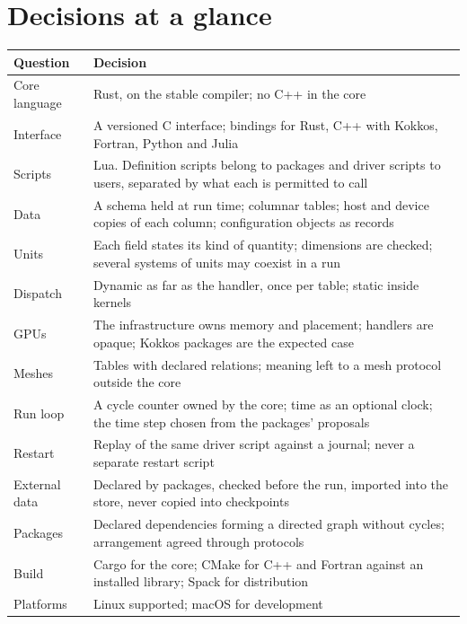 \documentclass[11pt,a4paper]{article}
\begin{document}
\section{Decisions at a glance}

\begin{center}
\small
\begin{tabularx}{\textwidth}{@{}>{\raggedright\arraybackslash}p{36mm} L@{}}
\toprule
Question & Decision \\
\midrule
Core language & Rust, on the stable compiler; no C++ in the core \\
Interface & A versioned C interface; bindings for Rust, C++ with Kokkos, Fortran, Python and Julia \\
Scripts & Lua.  Definition scripts belong to packages and driver scripts to users, separated by what each is permitted to call \\
Data & A schema held at run time; columnar tables; host and device copies of each column; configuration objects as records \\
Units & Each field states its kind of quantity; dimensions are checked; several systems of units may coexist in a run \\
Dispatch & Dynamic as far as the handler, once per table; static inside kernels \\
GPUs & The infrastructure owns memory and placement; handlers are opaque; Kokkos packages are the expected case \\
Meshes & Tables with declared relations; meaning left to a mesh protocol outside the core \\
Run loop & A cycle counter owned by the core; time as an optional clock; the time step chosen from the packages' proposals \\
Restart & Replay of the same driver script against a journal; never a separate restart script \\
External data & Declared by packages, checked before the run, imported into the store, never copied into checkpoints \\
Packages & Declared dependencies forming a directed graph without cycles; arrangement agreed through protocols \\
Build & Cargo for the core; CMake for C++ and Fortran against an installed library; Spack for distribution \\
Platforms & Linux supported; macOS for development \\
\bottomrule
\end{tabularx}
\end{center}
\end{document}

